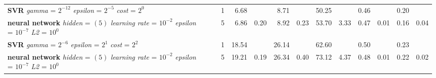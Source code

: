 {\begin{table}[ht]
\begin{tabular}{lllrrrrrrrrrrr}
  \makecell[tl]{\textbf{SVR}\\ \textit{gamma} = $2^{-12}$ \\ \textit{epsilon} = $2^{-5}$ \\ \textit{cost} = $2^{0}$} & \cellcolor[HTML]{FFFF88}{summer} & \cellcolor[HTML]{EADAFF}{seasonal} &   1 & 6.68 &  & 8.71 &  & 50.25 &  & 0.46 &  & 0.20 &  \\ 
  \makecell[tl]{\textbf{neural network}\\ \textit{hidden} = $(5)$ \\ \textit{learning rate} = $10^{-2}$ \\ \textit{epsilon} = $10^{-7}$ \\ \textit{L2} = $10^{0}$} & \cellcolor[HTML]{FFFF88}{summer} & \cellcolor[HTML]{EADAFF}{seasonal} &   5 & 6.86 & 0.20 & 8.92 & 0.23 & 53.70 & 3.33 & 0.47 & 0.01 & 0.16 & 0.04 \\ 
  \makecell[tl]{\textbf{SVR}\\ \textit{gamma} = $2^{-6}$ \\ \textit{epsilon} = $2^{1}$ \\ \textit{cost} = $2^{2}$} & \cellcolor[HTML]{FFAA88}{autumn} & \cellcolor[HTML]{FFFFFF}{all} &   1 & 18.54 &  & 26.14 &  & 62.60 &  & 0.50 &  & 0.23 &  \\ 
  \makecell[tl]{\textbf{neural network}\\ \textit{hidden} = $(5)$ \\ \textit{learning rate} = $10^{-2}$ \\ \textit{epsilon} = $10^{-7}$ \\ \textit{L2} = $10^{0}$} & \cellcolor[HTML]{FFAA88}{autumn} & \cellcolor[HTML]{FFFFFF}{all} &   5 & 19.21 & 0.19 & 26.34 & 0.40 & 73.12 & 4.37 & 0.48 & 0.01 & 0.22 & 0.02 \\ 
   \bottomrule
\end{tabular}
\endgroup
\end{table}

}
